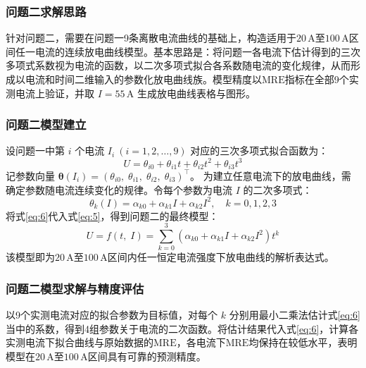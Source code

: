 \documentclass[withoutpreface,bwprint]{cumcmthesis} %
\begin{document}
\subsubsection{问题二求解思路}
针对问题二，需要在问题一9条离散电流曲线的基础上，构造适用于$20\,\text{A}$至$100\,\text{A}$区间任一电流的连续放电曲线模型。基本思路是：将问题一各电流下估计得到的三次多项式系数视为电流的函数，以二次多项式拟合各系数随电流的变化规律，从而形成以电流和时间二维输入的参数化放电曲线族。模型精度以$\mathrm{MRE}$指标在全部9个实测电流上验证，并取 $I=55\,\text{A}$ 生成放电曲线表格与图形。

\subsubsection{问题二模型建立}
设问题一中第 $i$ 个电流 $I_{i}~(i=1,2,\dots,9)$ 对应的三次多项式拟合函数为：
\begin{equation}
U=\theta_{i0}+\theta_{i1}t+\theta_{i2}t^{2}+\theta_{i3}t^{3}
\label{eq:5}
\end{equation}
记参数向量 $\boldsymbol{\theta}\left(I_{i}\right)=\left(\theta_{i0},\; \theta_{i1},\; \theta_{i2},\; \theta_{i3}\right)^{\top}$。
为建立任意电流下的放电曲线，需确定参数随电流连续变化的规律。令每个参数为电流 $I$ 的二次多项式：
\begin{equation}
\theta_{k}\left(I\right)=\alpha_{k0}+\alpha_{k1}I+\alpha_{k2}I^{2},\quad k=0,1,2,3
\label{eq:6}
\end{equation}
将式\eqref{eq:6}代入式\eqref{eq:5}，得到问题二的最终模型：
\begin{equation}
U=f\left(t,\; I\right)=\sum_{k=0}^{3} \left(\alpha_{k0}+\alpha_{k1}I+\alpha_{k2}I^{2}\right)t^{k}
\label{eq:7}
\end{equation}
该模型即为$20\,\text{A}$至$100\,\text{A}$区间内任一恒定电流强度下放电曲线的解析表达式。
\subsubsection{问题二模型求解与精度评估}
以9个实测电流对应的拟合参数为目标值，对每个 $k$ 分别用最小二乘法估计式\eqref{eq:6}当中的系数，得到4组参数关于电流的二次函数。将估计结果代入式\eqref{eq:6}，计算各实测电流下拟合曲线与原始数据的$\mathrm{MRE}$，各电流下$\mathrm{MRE}$均保持在较低水平，表明模型在$20\,\text{A}$至$100\,\text{A}$区间具有可靠的预测精度。
\end{document}

